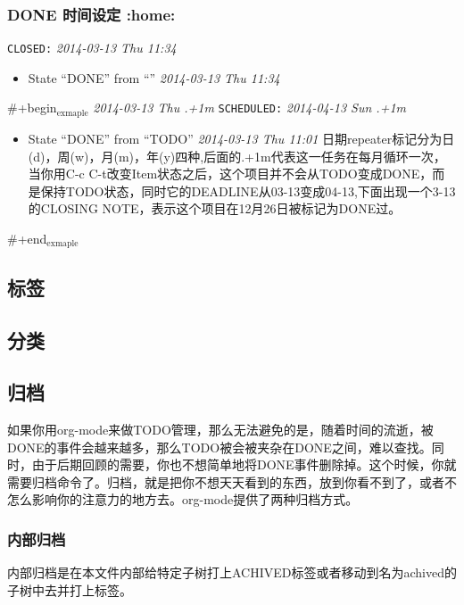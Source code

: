 \documentclass[11pt]{article}
\begin{document}
   
\subsubsection{\textbf{DONE} 时间设定 \textbf{:home:}}
\label{sec-7-3-1}

    \texttt{CLOSED:} \textit{2014-03-13 Thu 11:34}

\begin{itemize}
\item State ``DONE''       from ``''           \textit{2014-03-13 Thu 11:34}
\end{itemize}
    \#+begin$_{\mathrm{exmaple}}$
    \textit{2014-03-13 Thu .+1m} 
    \texttt{SCHEDULED:} \textit{2014-04-13 Sun .+1m}

\begin{itemize}
\item State ``DONE''       from ``TODO''       \textit{2014-03-13 Thu 11:01}
    日期repeater标记分为日(d)，周(w)，月(m)，年(y)四种,后面的.+1m代表这一任务在每月循环一次，当你用C-c C-t改变Item状态之后，这个项目并不会从TODO变成DONE，而是保持TODO状态，同时它的DEADLINE从03-13变成04-13,下面出现一个3-13的CLOSING NOTE，表示这个项目在12月26日被标记为DONE过。
\end{itemize}

    \#+end$_{\mathrm{exmaple}}$
    
\subsection{标签}
\label{sec-7-4}
\subsection{分类}
\label{sec-7-5}
\subsection{归档}
\label{sec-7-6}

   如果你用org-mode来做TODO管理，那么无法避免的是，随着时间的流逝，被DONE的事件会越来越多，那么TODO被会被夹杂在DONE之间，难以查找。同时，由于后期回顾的需要，你也不想简单地将DONE事件删除掉。这个时候，你就需要归档命令了。归档，就是把你不想天天看到的东西，放到你看不到了，或者不怎么影响你的注意力的地方去。org-mode提供了两种归档方式。
\subsubsection{内部归档}
\label{sec-7-6-1}

    内部归档是在本文件内部给特定子树打上ACHIVED标签或者移动到名为achived的子树中去并打上标签。
\end{document}

